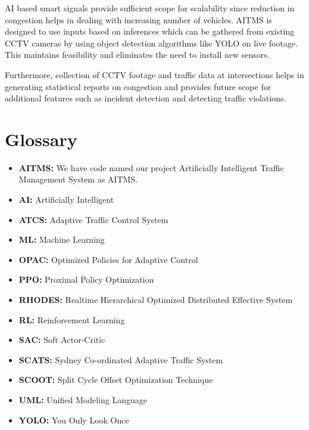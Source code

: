 \documentclass[openany,12pt]{report}
\begin{document}
\hspace*{0.5in}AI based smart signals provide sufficient scope for scalability since reduction in congestion helps in dealing with increasing number of vehicles. AITMS is designed to use inputs based on inferences which can be gathered from existing CCTV cameras by using object detection algorithms like YOLO on live footage. This maintains feasibility and eliminates the need to install new sensors.

\hspace*{0.5in}Furthermore, collection of CCTV footage and traffic data at intersections helps in generating statistical reports on congestion and provides future scope for additional features such as incident detection and detecting traffic violations.
	
	
		
		
		\appendix
		\cleardoublepage
		
		\chapter{Glossary}
		\begin{itemize}
			\item{\textbf{AITMS:}} We have code named our project Artificially Intelligent Traffic Management System as AITMS.
			\item{\textbf {AI:}} Artificially Intelligent
			\item{\textbf {ATCS:}} Adaptive Traffic Control System
			\item{\textbf {ML:}} Machine Learning
			\item{\textbf {OPAC:}} Optimized Policies for Adaptive Control			
			\item{\textbf {PPO:}} Proximal Policy Optimization
			\item{\textbf {RHODES:}} Realtime Hierarchical Optimized Distributed Effective System
			\item{\textbf {RL:}} Reinforcement Learning
			\item{\textbf {SAC:}} Soft Actor-Critic
			\item{\textbf {SCATS:}} Sydney Co-ordinated Adaptive Traffic System
			\item{\textbf {SCOOT:}} Split Cycle Offset Optimization Technique
			\item{\textbf {UML:}} Unified Modeling Language
			\item{\textbf {YOLO:}} You Only Look Once
			
		\end{itemize}
		
\end{document}
